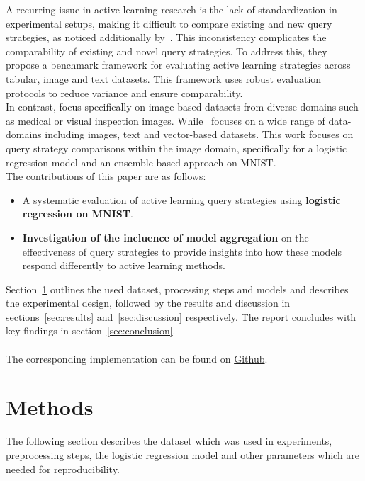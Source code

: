 \documentclass{article}
\theoremstyle{plain}
\theoremstyle{definition}
\theoremstyle{remark}
\begin{document}
A recurring issue in active learning research is the lack of standardization in experimental setups, making it difficult to compare existing and new query strategies, as noticed additionally by~\cite{werner_comparableactivelearning}. This inconsistency complicates the comparability of existing and novel query strategies. To address this, they propose a benchmark framework for evaluating active learning strategies across tabular, image and text datasets. This framework uses robust evaluation protocols to reduce variance and ensure comparability. \\
In contrast, \cite{ueno_benchmarkingofquerystrategies} focus specifically on image-based datasets from diverse domains such as medical or visual inspection images. While~\cite{werner_comparableactivelearning} focuses on a wide range of data-domains including images, text and vector-based datasets.
This work focuses on query strategy comparisons within the image domain, specifically for a logistic regression model and an ensemble-based approach on MNIST. \\
The contributions of this paper are as follows:
\begin{itemize}
	\item A systematic evaluation of active learning query strategies using \textbf{logistic regression on MNIST}.
	\item \textbf{Investigation of the incluence of model aggregation} on the effectiveness of query strategies to provide insights into how these models respond differently to active learning methods.
\end{itemize}
Section~\ref{sec:methods} outlines the used dataset, processing steps and models and describes the experimental design, followed by the results and discussion in sections~\ref{sec:results} and~\ref{sec:discussion} respectively. The report concludes with key findings in section~\ref{sec:conclusion}. \\
\\
The corresponding implementation can be found on \textcolor{red}{\href{https://github.com/LukaslWeber/NLP_II_Interactive_Learning}{Github}}.

\section{Methods}\label{sec:methods}
The following section describes the dataset which was used in experiments, preprocessing steps, the logistic regression model and other parameters which are needed for reproducibility.
\end{document}
